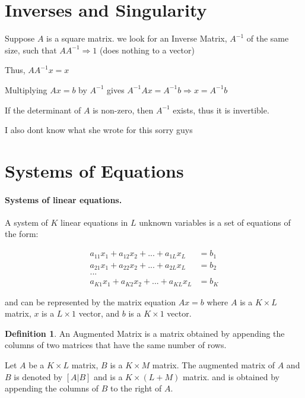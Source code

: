 \documentclass{article}
\theoremstyle{definition}
\newtheorem{definition}[theorem]{Definition}
\theoremstyle{remark}
\begin{document}
\section{Inverses and Singularity}

Suppose $A$ is a square matrix. we look for an Inverse Matrix, $A^{-1}$ of the same size, such that $AA^{-1} \Rightarrow 1$ (does nothing to a vector) 

Thus, $AA^{-1}x = x$

Multiplying $Ax = b$ by $A^{-1}$ gives $A^{-1}Ax = A^{-1}b \Rightarrow x = A^{-1}b$

If the determinant of $A$ is non-zero, then $A^{-1}$ exists, thus it is invertible. 

\bigskip
\bigskip
\bigskip

I also dont know what she wrote for this sorry guys 

\section{Systems of Equations}

\paragraph{Systems of linear equations.} 

A system of $K$ linear equations in $L$ unknown variables is a set of equations of the form:

\begin{align*}
    a_{11}x_1 + a_{12}x_2 + ... + a_{1L}x_L &= b_1 \\
    a_{21}x_1 + a_{22}x_2 + ... + a_{2L}x_L &= b_2 \\
    ... \\
    a_{K1}x_1 + a_{K2}x_2 + ... + a_{KL}x_L &= b_K
\end{align*}

and can be represented by the matrix equation $Ax = b$ where $A$ is a $K \times L$ matrix, $x$ is a $L \times 1$ vector, and $b$ is a $K \times 1$ vector.

\begin{definition}
    An Augmented Matrix is a matrix obtained by appending the columns of two matrices that have the same number of rows.
\end{definition}

Let $A$ be a $K \times L$ matrix, $B$ is a $K \times M$ matrix. The augmented matrix of $A$ and $B$ is denoted by $[A|B]$ and is a $K \times (L+M)$ matrix. and is obtained by appending the columns of $B$ to the right of $A$. 
\end{document}
